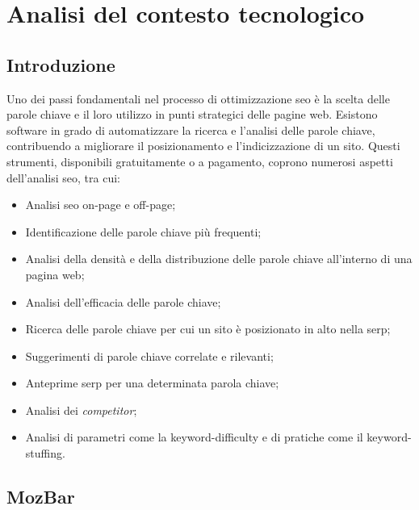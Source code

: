 \chapter{Analisi del contesto tecnologico}
\label{cap:analisi-soluzioni-esistenti}


\section{Introduzione}

\par Uno dei passi fondamentali nel processo di ottimizzazione \gls{seo} è la scelta delle parole chiave e il loro utilizzo in punti strategici delle pagine web. Esistono software in grado di automatizzare la ricerca e l'analisi delle parole chiave, contribuendo a migliorare il posizionamento e l'indicizzazione di un sito. Questi strumenti, disponibili gratuitamente o a pagamento, coprono numerosi aspetti dell'analisi \gls{seo}, tra cui:
\begin{itemize}
    \item Analisi \gls{seo} \gls{on-page} e \gls{off-page};
    \item Identificazione delle parole chiave più frequenti;
    \item Analisi della densità e della distribuzione delle parole chiave all'interno di una pagina web;
    \item Analisi dell'efficacia delle parole chiave;
    \item Ricerca delle parole chiave per cui un sito è posizionato in alto nella \gls{serp};
    \item Suggerimenti di parole chiave correlate e rilevanti;
    \item Anteprime \gls{serp} per una determinata parola chiave;
    \item Analisi dei \textit{competitor};
    \item Analisi di parametri come la \gls{keyword-difficulty} e di pratiche come il \gls{keyword-stuffing}.
\end{itemize}

\section{MozBar}

